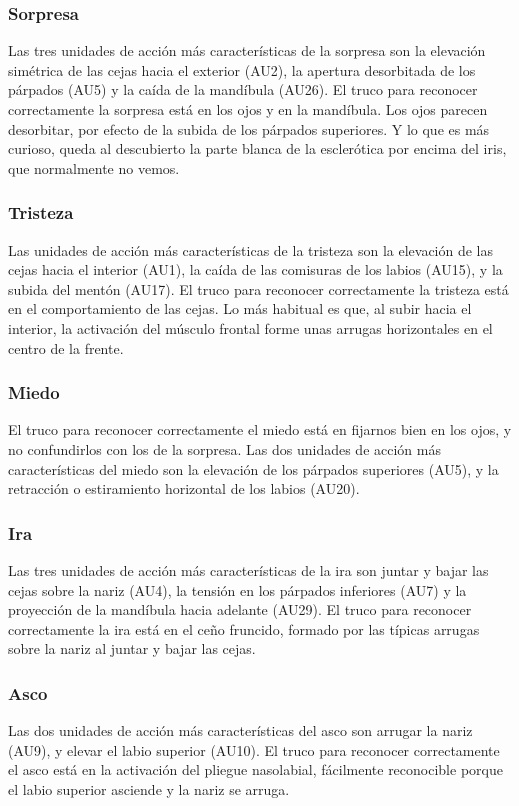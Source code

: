 \subsubsection*{Sorpresa}
Las tres unidades de acción más características de la sorpresa son la elevación simétrica de las cejas hacia el exterior (AU2), la apertura desorbitada de los párpados (AU5) y la caída de la mandíbula (AU26). El truco para reconocer correctamente la sorpresa está en los ojos y en la mandíbula. Los ojos parecen desorbitar, por efecto de la subida de los párpados superiores. Y lo que es más curioso, queda al descubierto la parte blanca de la esclerótica por encima del iris, que normalmente no vemos.

\subsubsection*{Tristeza}
Las unidades de acción más características de la tristeza son la elevación de las cejas hacia el interior (AU1), la caída de las comisuras de los labios (AU15), y la subida del mentón (AU17). El truco para reconocer correctamente la tristeza está en el comportamiento de las cejas. Lo más habitual es que, al subir hacia el interior, la activación del músculo frontal forme unas arrugas horizontales en el centro de la frente.

\subsubsection*{Miedo}
El truco para reconocer correctamente el miedo está en fijarnos bien en los ojos, y no confundirlos con los de la sorpresa. Las dos unidades de acción más características del miedo son la elevación de los párpados superiores (AU5), y la retracción o estiramiento horizontal de los labios (AU20).

\subsubsection*{Ira}
Las tres unidades de acción más características de la ira son juntar y bajar las cejas sobre la nariz (AU4), la tensión en los párpados inferiores (AU7) y la proyección de la mandíbula hacia adelante (AU29). El truco para reconocer correctamente la ira está en el ceño fruncido, formado por las típicas arrugas sobre la nariz al juntar y bajar las cejas. 

\subsubsection*{Asco}
Las dos unidades de acción más características del asco son arrugar la nariz (AU9), y elevar el labio superior (AU10). El truco para reconocer correctamente el asco está en la activación del pliegue nasolabial, fácilmente reconocible porque el labio superior asciende y la nariz se arruga.

